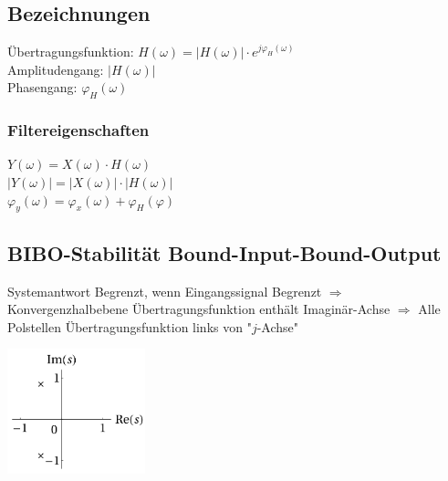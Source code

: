 \begin{multicols}{2}
    \subsection{Bezeichnungen}
    Übertragungsfunktion: $H(\omega)=|H(\omega)| \cdot e^{j\varphi_H(\omega)}$ \\
    Amplitudengang: $|H(\omega)|$ \\
    Phasengang: $\varphi_H(\omega)$ \\

    \subsubsection{Filtereigenschaften}
    $Y(\omega) = X(\omega) \cdot H(\omega)$ \\
    $|Y(\omega)| = |X(\omega)| \cdot |H(\omega)|$ \\
    $\varphi_y(\omega) = \varphi_x(\omega) + \varphi_H(\varphi)$

    \subsection{BIBO-Stabilität \tiny {Bound-Input-Bound-Output}}

    Systemantwort Begrenzt, wenn Eingangssignal Begrenzt
    \newline $\Rightarrow$ Konvergenzhalbebene Übertragungsfunktion enthält Imaginär-Achse
    \newline $\Rightarrow$ Alle Polstellen Übertragungsfunktion links von "$j$-Achse"
    \begin{center}
        \includegraphics[width = 4cm]{include/Integraltransformationen/img/BiBo.png}
    \end{center}
\end{multicols}
